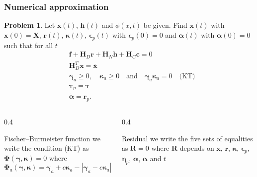 \documentclass[8pt]{beamer}
\numberwithin{equation}{section}
\theoremstyle{definition}
\newtheorem*{prb*}{Problem}
\begin{document}
\begin{frame}
\frametitle{Numerical approximation}
\begin{prb*}
Let $\overline{\boldsymbol{x}}(t)$, $\boldsymbol{h}(t)$ and $\phi(x,t)$ be given. Find $\boldsymbol{x}(t)$ with $\boldsymbol{x}(0)=\boldsymbol{X}$, $\boldsymbol{r}(t)$, $\boldsymbol{\kappa}(t)$, $\boldsymbol{\epsilon}_p(t)$ with $\boldsymbol{\epsilon}_p(0)=0$ and $\boldsymbol{\alpha}(t)$ with $\boldsymbol{\alpha}(0)=0$ such that for all $t$
\begin{align*}
& \boldsymbol{f}+\boldsymbol{H}_D\boldsymbol{r}+\boldsymbol{H}_N\boldsymbol{h}+\boldsymbol{H}_C\boldsymbol{c}=0 \\
& \boldsymbol{H}_D^T\boldsymbol{x}=\overline{\boldsymbol{x}} \\
\label{eqn:truss-KT}
& \boldsymbol\gamma_a\ge0,\quad\boldsymbol\kappa_a\ge 0\quad\text{and}\quad\boldsymbol\gamma_a\boldsymbol\kappa_a=0\quad\text{(KT)} \\
& \boldsymbol\tau_p=\boldsymbol\tau \\
& \dot{\boldsymbol\alpha}=\boldsymbol r_p.
\end{align*}
\end{prb*}

\begin{columns}
\begin{column}{0.4\textwidth}
\begin{block}{\centering Fischer--Burmeister function}
\centering we write the condition (KT) as $\boldsymbol{\Phi}(\boldsymbol{\gamma},\boldsymbol{\kappa})=0$ where
\[
\boldsymbol\Phi_a(\boldsymbol\gamma,\boldsymbol\kappa)=\boldsymbol\gamma_a+c\boldsymbol\kappa_a-|\boldsymbol\gamma_a-c\boldsymbol\kappa_a|
\]
\end{block}
\end{column}

\begin{column}{0.4\textwidth}
\begin{block}{\centering Residual}
we write the five sets of equalities as $\boldsymbol{R}=0$ where $\boldsymbol{R}$ depends on $\boldsymbol{x}$, $\boldsymbol{r}$, $\boldsymbol{\kappa}$, $\boldsymbol{\epsilon}_p$, $\boldsymbol{\eta}_p$, $\boldsymbol{\alpha}$, $\boldsymbol{\dot\alpha}$ and $t$
\end{block}
\end{column}
\end{columns}
\end{frame}
\end{document}
